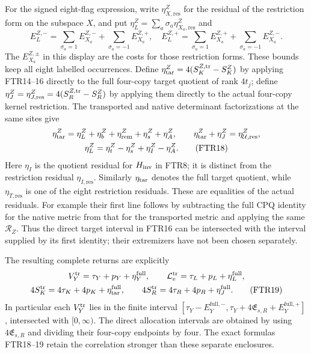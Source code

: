 \documentclass[11pt,a4paper]{article}
\begin{document}
For the signed eight-flag expression, write
$\eta_{X,\mathrm{res}}^Z$ for the residual of the restriction
form on the subspace $X$, and put
$\eta_L^Z=\sum_a\sigma_a\eta_{X_a,\mathrm{res}}^Z$ and
\[
 E_L^{Z,-}=\sum_{\sigma_a=1}E_{X_a}^{Z,-}
              +\sum_{\sigma_a=-1}E_{X_a}^{Z,+},\quad
 E_L^{Z,+}=\sum_{\sigma_a=1}E_{X_a}^{Z,+}
              +\sum_{\sigma_a=-1}E_{X_a}^{Z,-}.          \tag{FTR17}
\]
The $E_{X_a}^{Z,\pm}$ in this display are the costs for those
restriction forms. These bounds keep all eight labelled occurrences.
Define
$\eta_{\rm tar}^Z=4(S_K^{Z,\rm tr}-S_K^Z)$ by applying FTR14--16
directly to the full four-copy target quotient of rank $4t_j$;
define $\eta_J^Z=\eta_{J,\mathrm{res}}^Z
 =4(S_R^{Z,\rm tr}-S_R^Z)$ by applying them
directly to the actual four-copy kernel restriction. The transported
and native determinant factorizations at the same sites give
\[
\begin{gathered}
 \eta_{\rm tar}^Z=\eta_L^Z+\eta_b^Z+\eta_{\rm rem}^Z+\eta_s^Z+\eta_A^Z,
 \qquad \eta_{\rm tar}^Z+\eta_J^Z=\eta_{\mathcal U,\mathrm{res}}^Z,\\
 \eta_L^Z=\eta_t^Z-\eta_s^Z+\eta_I^Z-\eta_A^Z .         \tag{FTR18}
\end{gathered}
\]
Here $\eta_I$ is the quotient residual for $H_{\rm inv}$ in
FTR8; it is distinct from the restriction residual
$\eta_{I,\mathrm{res}}$. Similarly $\eta_{\rm tar}$ denotes
the full target quotient, while $\eta_{T,\mathrm{res}}$ is
one of the eight restriction residuals. These are equalities
of the actual residuals. For example their
first line follows by subtracting the full CPQ identity for the
native metric from that for the transported metric and applying
the same $\mathcal R_Z$. Thus the direct target interval in
FTR16 can be intersected with the interval supplied by its first
identity; their extremizers have not been chosen separately.

The resulting complete returns are explicitly
\[
\begin{gathered}
 V_Y^{\rm tr}=\tau_Y+p_Y+\eta_Y^{\rm full},\qquad
 \mathcal L_e^{\rm tr}=\tau_L+p_L+\eta_L^{\rm full},\\
 4S_K^{\rm tr}=4\tau_K+4p_K+\eta_{\rm tar}^{\rm full},\qquad
 4S_R^{\rm tr}=4\tau_R+4p_R+\eta_J^{\rm full} .          \tag{FTR19}
\end{gathered}
\]
In particular each $V_Y^{\rm tr}$ lies in the finite interval
$[\tau_Y-E_Y^{\mathrm{full},-},
\tau_Y+4\mathfrak E_{s,R}+E_Y^{\mathrm{full},+}]$,
intersected with $[0,\infty)$. The direct allocation intervals
are obtained by using $4\mathfrak E_{s,R}$ and dividing their
four-copy endpoints by four. The exact formulas FTR18--19 retain
the correlation stronger than these separate enclosures.
\end{document}
